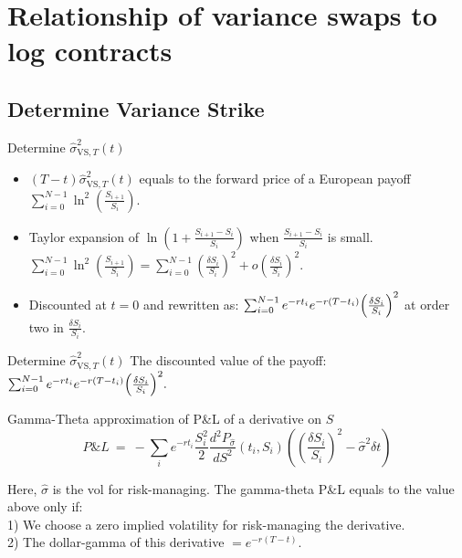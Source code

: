 \documentclass{beamer}
\begin{document}
\section{Relationship of variance swaps to log contracts}
   
    \subsection{Determine Variance Strike}
    \begin{frame}{Determine $\widehat{\sigma}_{\text{VS},T}^{2}\left(t\right)$}

    \begin{itemize}
        \item $(T-t)\widehat{\sigma}_{\text{VS},T}^{2}\left(t\right)$ equals to the forward price of a European payoff 
       $\sum_{i=0}^{N-1}\ln^{2}\left(\frac{S_{i+1}}{S_{i}}\right).$
        \item Taylor expansion of $\ln (1+\frac{S_{i+1}-S_{i}}{S_{i}})$ when $\frac{S_{i+1}-S_{i}}{S_{i}}$ is small.
         $\sum_{i=0}^{N-1}\ln^{2}\left(\frac{S_{i+1}}{S_{i}}\right) = \sum_{i=0}^{N-1}(\frac{\delta S_{i}}{S_{i}})^{2} + o(\frac{\delta S_{i}}{S_{i}})^{2}.$
        \item Discounted at $t=0$ and rewritten as:
        $\sum_{i=0}^{N-1}e^{-rt_{i}}e^{-r(T-t_{i})}\Big{(}\frac{\delta S_{i}}{S_{i}} \Big{)}^{2}$ at order two in $\frac{\delta S_{i}}{S_{i}}$.
    \end{itemize}
    \end{frame}

    \begin{frame}{Determine $\widehat{\sigma}_{\text{VS},T}^{2}\left(t\right)$}
    The discounted value of the payoff:
    $\sum_{i=0}^{N-1}e^{-rt_{i}}e^{-r(T-t_{i})}\Big{(}\frac{\delta S_{i}}{S_{i}} \Big{)}^{2}.$
    \begin{block}{Gamma-Theta approximation of P\&L of a derivative on $S$}
        \[P\&L\ =\ -{\sum_{i}}e^{-rt_{i}}\frac{S_{i}^{2}}{2}\frac{d^{2}P_{\widehat{ \sigma}}}{dS^{2}}\left(t_{i},S_{i}\right)\left((\frac{\delta S_{i}}{S_{i}})^{2}-\widehat{\sigma}^{2} \delta t\right) \] 
    \end{block}
    Here, $\widehat{\sigma}$ is the vol for risk-managing.
    The gamma-theta P\&L equals to the value above only if: \\
    1) We choose a zero implied volatility for risk-managing the derivative.\\
    2) The dollar-gamma of this derivative $= e^{-r(T-t)}$.
    \end{frame}
\end{document}
